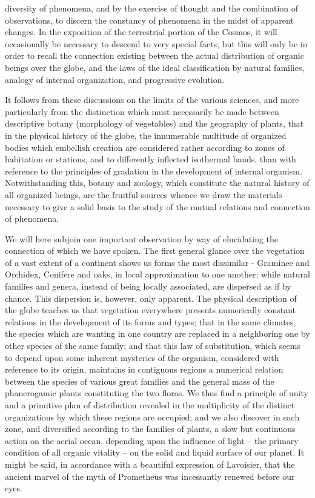 diversity of phenomena, and by the exercise of thought and the combination of observations, to discern the constancy of phenomena in the midst of apparent changes. In the exposition of the terrestrial portion of the Cosmos, it will occasionally be necessary to descend to very special facts; but this will only be in order to recall the connection existing between the actual distribution of organic beings over the globe, and the laws of the ideal classification by natural families, analogy of internal organization, and progressive evolution.

It follows from these discussions on the limits of the various sciences, and more particularly from the distinction which must necessarily be made between descriptive botany (morphology of vegetables) and the geography of plants, that in the physical history of the globe, the innumerable multitude of organized bodies which embellish creation are considered rather according to zones of habitation or stations, and to differently inflected isothermal bands, than with reference to the principles of gradation in the development of internal organism. Notwithstanding this, botany and zoology, which constitute the natural history of all organized beings, are the fruitful sources whence we draw the materials necessary to give a solid basis to the study of the mutual relations and connection of phenomena.

We will here subjoin one important observation by way of elucidating the connection of which we have spoken. The first general glance over the vegetation of a vast extent of a continent shows us forms the most dissimilar - Graminee and Orchidex, Conifere and oaks, in local approximation to one another; while natural families and genera, instead of being locally associated, are dispersed as if by chance. This dispersion is, however, only apparent. The physical description of the globe teaches us that vegetation everywhere presents numerically constant relations in the development of its forms and types; that in the same climates, the species which are wanting in one country are replaced in a neighboring one by other species of the same family; and that this law of substitution, which seems to depend upon some inherent mysteries of the organism, considered with reference to its origin, maintains in contiguous regions a numerical relation between the species of various great families and the general mass of the phanerogamic plants constituting the two floras. We thus find a principle of unity and a primitive plan of distribution revealed in the multiplicity of the distinct organizations by which these regions are occupied; and we also discover in each zone, and diversified according to the families of plants, a slow but continuous action on the aerial ocean, depending upon the influence of light -- the primary condition of all organic vitality -- on the solid and liquid surface of our planet. It might be said, in accordance with a beautiful expression of Lavoisier, that the ancient marvel of the myth of Prometheus was incessantly renewed before our eyes.

